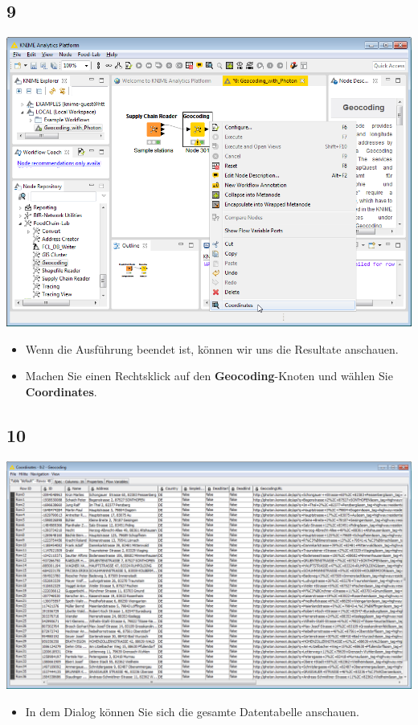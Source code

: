 \documentclass{beamer}
\begin{document}
\subsection{9}
\begin{frame}
	\begin{center}
  		\includegraphics[height=0.6\textheight]{9.png}
	\end{center}
	\begin{itemize}
		\item Wenn die Ausführung beendet ist, können wir uns die Resultate anschauen.
		\item Machen Sie einen Rechtsklick auf den \textbf{Geocoding}-Knoten und wählen Sie \textbf{Coordinates}.
	\end{itemize}
\end{frame}

\subsection{10}
\begin{frame}
	\begin{center}
  		\includegraphics[height=0.6\textheight]{10.png}
	\end{center}
	\begin{itemize}
		\item In dem Dialog können Sie sich die gesamte Datentabelle anschauen.
	\end{itemize}
\end{frame}
\end{document}
